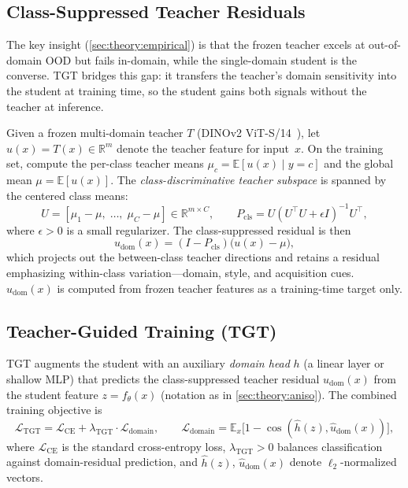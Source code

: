 \documentclass[runningheads]{llncs}
\begin{document}
\subsection{Class-Suppressed Teacher Residuals}
\label{sec:method:residuals}

The key insight (\cref{sec:theory:empirical}) is that the frozen teacher excels at out-of-domain OOD but fails in-domain, while the single-domain student is the converse.
TGT bridges this gap: it transfers the teacher's domain sensitivity into the student at training time, so the student gains both signals without the teacher at inference.

Given a frozen multi-domain teacher $T$ (DINOv2 ViT-S/14~\cite{Oquab2024dinov2}), let $u(x) = T(x) \in \mathbb{R}^m$ denote the teacher feature for input~$x$.
On the training set, compute the per-class teacher means $\mu_c = \mathbb{E}[u(x) \mid y{=}c]$ and the global mean $\mu = \mathbb{E}[u(x)]$.
The \emph{class-discriminative teacher subspace} is spanned by the centered class means:
\begin{equation}
  U = [\mu_1{-}\mu,\;\ldots,\;\mu_C{-}\mu] \in \mathbb{R}^{m \times C}, \qquad
  P_{\mathrm{cls}} = U(U^\top U + \epsilon I)^{-1}U^\top,
  \label{eq:pcls}
\end{equation}
where $\epsilon > 0$ is a small regularizer.
The class-suppressed residual is then
\begin{equation}
  u_{\mathrm{dom}}(x) = (I - P_{\mathrm{cls}})\bigl(u(x) - \mu\bigr),
  \label{eq:udom}
\end{equation}
which projects out the between-class teacher directions and retains a residual emphasizing within-class variation---domain, style, and acquisition cues.
$u_{\mathrm{dom}}(x)$ is computed from frozen teacher features as a training-time target only.

\subsection{Teacher-Guided Training (TGT)}
\label{sec:method:tgt}

TGT augments the student with an auxiliary \emph{domain head} $h$ (a linear layer or shallow MLP) that predicts the class-suppressed teacher residual $u_{\mathrm{dom}}(x)$ from the student feature $z = f_\theta(x)$ (notation as in \cref{sec:theory:aniso}).
The combined training objective is
\begin{equation}
  \mathcal{L}_{\mathrm{TGT}} = \mathcal{L}_{\mathrm{CE}} + \lambda_{\mathrm{TGT}} \cdot \mathcal{L}_{\mathrm{domain}}, \qquad
  \mathcal{L}_{\mathrm{domain}} = \mathbb{E}_x\bigl[1 - \cos(\hat{h}(z), \hat{u}_{\mathrm{dom}}(x))\bigr],
  \label{eq:tgt}
\end{equation}
where $\mathcal{L}_{\mathrm{CE}}$ is the standard cross-entropy loss, $\lambda_{\mathrm{TGT}} > 0$ balances classification against domain-residual prediction, and $\hat{h}(z)$, $\hat{u}_{\mathrm{dom}}(x)$ denote $\ell_2$-normalized vectors.
\end{document}
